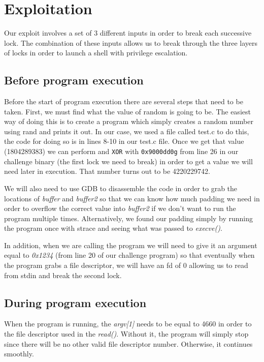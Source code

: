 \section{Exploitation}
Our exploit involves a set of 3 different inputs in order to break each successive lock. The combination of these inputs allows us to break through the three layers of locks in order to launch a shell with privilege escalation. 

\subsection{Before program execution}
Before the start of program execution there are several steps that need to be taken. First, we must find what the value of random is going to be. The easiest way of doing this is to create a program which simply creates a random number using rand and prints it out. In our case, we used a file called test.c to do this, the code for doing so is in lines 8-10 in our test.c file. Once we get that value (1804289383) we can perform and {\tt XOR} with {\tt 0x9000dd0g} from line 26 in our challenge binary (the first lock we need to break) in order to get a value we will need later in execution. That number turns out to be 4220229742.

We will also need to use GDB to disassemble the code in order to grab the locations of \emph{buffer} and \emph{buffer2} so that we can know how much padding we need in order to overflow the correct value into \emph{buffer2} if we don't want to run the program multiple times. Alternatively, we found our padding simply by running the program once with strace and seeing what was passed to \emph{execve()}. 

In addition, when we are calling the program we will need to give it an argument equal to \emph{0x1234} (from line 20 of our challenge program) so that eventually when the program grabs a file descriptor, we will have an fd of 0 allowing us to read from stdin and break the second lock.

\subsection{During program execution}
When the program is running, the \emph{argv[1]} needs to be equal to 4660 in order to the file descriptor used in the \emph{read()}. Without it, the program will simply stop since there will be no other valid file descriptor number. Otherwise, it continues smoothly.

